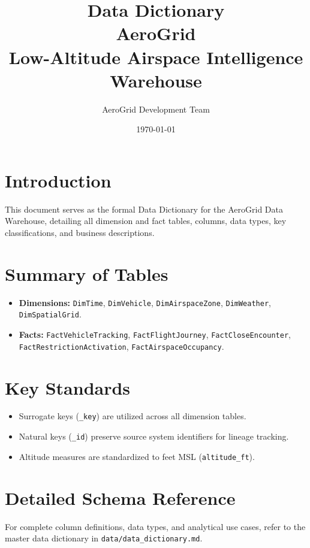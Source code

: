 \documentclass[11pt,a4paper]{article}
\title{\textbf{Data Dictionary}\\[0.5cm] \textbf{AeroGrid}\\[0.3cm] Low-Altitude Airspace Intelligence Warehouse}
\author{AeroGrid Development Team}
\date{\today}
\begin{document}
\maketitle

\section{Introduction}
This document serves as the formal Data Dictionary for the AeroGrid Data Warehouse, detailing all dimension and fact tables, columns, data types, key classifications, and business descriptions.

\section{Summary of Tables}
\begin{itemize}
    \item \textbf{Dimensions:} \texttt{DimTime}, \texttt{DimVehicle}, \texttt{DimAirspaceZone}, \texttt{DimWeather}, \texttt{DimSpatialGrid}.
    \item \textbf{Facts:} \texttt{FactVehicleTracking}, \texttt{FactFlightJourney}, \texttt{FactCloseEncounter}, \texttt{FactRestrictionActivation}, \texttt{FactAirspaceOccupancy}.
\end{itemize}

\section{Key Standards}
\begin{itemize}
    \item Surrogate keys (\texttt{\_key}) are utilized across all dimension tables.
    \item Natural keys (\texttt{\_id}) preserve source system identifiers for lineage tracking.
    \item Altitude measures are standardized to feet MSL (\texttt{altitude\_ft}).
\end{itemize}

\section{Detailed Schema Reference}
For complete column definitions, data types, and analytical use cases, refer to the master data dictionary in \texttt{data/data\_dictionary.md}.
\end{document}
